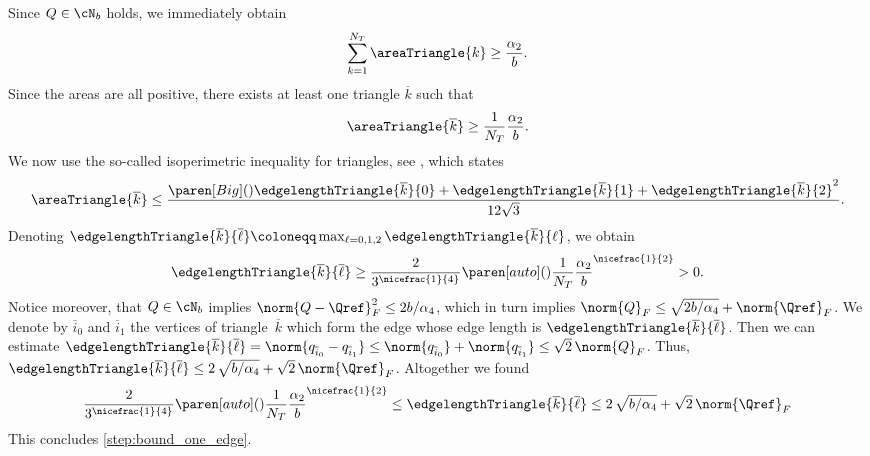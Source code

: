 Since $Q \in \cN_b$ holds, we immediately obtain
\begin{equation}
	\sum_{k=1}^{N_T} \areaTriangle{k}
	\ge
	\frac{\alpha_2}{b}
	.
\end{equation}
Since the areas are all positive, there exists at least one triangle $\overline{k}$ such that
\begin{equation*}
	\areaTriangle{\overline{k}}
	\ge
	\frac{1}{N_T} \frac{\alpha_2}{b}
	.
\end{equation*}
We now use the so-called isoperimetric inequality for triangles, see \cite[Theorem~25, p.42]{AgricolaFriedrich:2008:1}, which states
\begin{equation}
	\label{eq:isoperimetric_inequality}
	\areaTriangle{\overline{k}}
	\le
	\frac{\paren[Big](){%
		\edgelengthTriangle{\overline{k}}{0} + \edgelengthTriangle{\overline{k}}{1} + \edgelengthTriangle{\overline{k}}{2}
		}^2
	}%
	{12 \sqrt{3}}
	.
\end{equation}
Denoting $\edgelengthTriangle{\overline{k}}{\overline{\ell}} \coloneqq \max_{\ell=0,1,2} \edgelengthTriangle{\overline{k}}{\ell}$, we obtain
\begin{equation*}
	\edgelengthTriangle{\overline{k}}{\overline{\ell}}
	\ge
	\frac{2}{3^{\nicefrac{1}{4}}}
	\paren[auto](){\frac{1}{N_T} \frac{\alpha_2}{b}}^{\nicefrac{1}{2}}
	>
	0
	.
\end{equation*}
Notice moreover, that $Q \in \cN_b$ implies $\norm{Q-\Qref}_F^2 \le 2b / \alpha_4$, which in turn implies $\norm{Q}_F \le \sqrt{2b / \alpha_4} + \norm{\Qref}_F$.
We denote by $\overline{i}_0$ and $\overline{i}_1$ the vertices of triangle~$\overline{k}$ which form the edge whose edge length is $\edgelengthTriangle{\overline{k}}{\overline{\ell}}$.
Then we can estimate $\edgelengthTriangle{\overline{k}}{\overline{\ell}} = \norm{q_{\overline{i}_0} - q_{\overline{i}_1}} \le \norm{q_{\overline{i}_0}} + \norm{q_{\overline{i}_1}}\le \sqrt{2} \, \norm{Q}_F$.
Thus, $\edgelengthTriangle{\overline{k}}{\overline{\ell}} \le 2 \, \sqrt{b / \alpha_4} + \sqrt{2} \, \norm{\Qref}_F$.
Altogether we found
\begin{equation}
	\label{eq:bounds_bar_k}
	\frac{2}{3^{\nicefrac{1}{4}}}
	\paren[auto](){\frac{1}{N_T} \frac{\alpha_2}{b}}^{\nicefrac{1}{2}}
	\le
	\edgelengthTriangle{\overline{k}}{\overline{\ell}}
	\le
	2 \, \sqrt{b / \alpha_4} + \sqrt{2} \, \norm{\Qref}_F
\end{equation}
This concludes \cref{step:bound_one_edge}.

